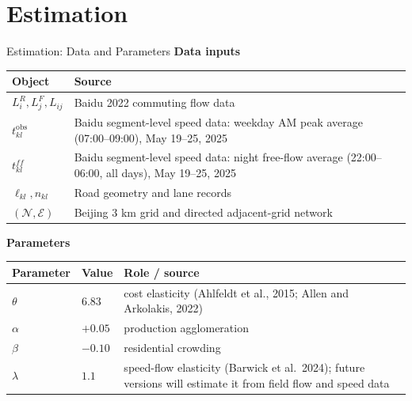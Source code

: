 \documentclass[11pt,aspectratio=169]{beamer}
\newcommand{\navfwd}[1]{\par\vspace{0.35em}\noindent\hfill\hyperlink{#1}{\beamergotobutton{details}}}
\begin{document}
\section{Estimation}\label{sec:quant}
\begin{frame}[label=estparams]{Estimation: Data and Parameters}
\small
\textbf{Data inputs}
\vspace{0.25em}

\scriptsize
\begin{tabularx}{0.92\textwidth}{@{}p{}X@{}}
\toprule
Object & Source \\
\midrule
$L_i^R,L_j^F,L_{ij}$ & Baidu 2022 commuting flow data \\
$t_{kl}^{\mathrm{obs}}$ & Baidu segment-level speed data: weekday AM peak average (07:00--09:00), May 19--25, 2025 \\
$t_{kl}^{ff}$ & Baidu segment-level speed data: night free-flow average (22:00--06:00, all days), May 19--25, 2025 \\
$\ell_{kl},n_{kl}$ & Road geometry and lane records \\
$(\mathcal N,\mathcal E)$ & Beijing 3 km grid and directed adjacent-grid network \\
\bottomrule
\end{tabularx}

\vspace{1.0em}
\textbf{Parameters}
\vspace{0.25em}

\scriptsize
\begin{tabularx}{0.92\textwidth}{@{}p{}p{}X@{}}
\toprule
Parameter & Value & Role / source \\
\midrule
$\theta$ & $6.83$ & cost elasticity (Ahlfeldt et al., 2015; Allen and Arkolakis, 2022) \\
$\alpha$ & $+0.05$ & production agglomeration \\
$\beta$ & $-0.10$ & residential crowding \\
$\lambda$ & $1.1$ & speed-flow elasticity (Barwick et al.\ 2024); future versions will estimate it from field flow and speed data \\
\bottomrule
\end{tabularx}
\navfwd{appparams}
\end{frame}
\end{document}

